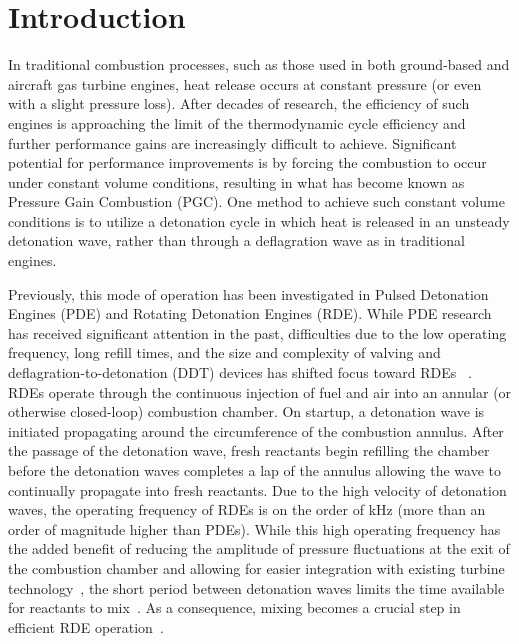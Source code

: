 \documentclass[10pt, twocolumn]{article}
\begin{document}
\saythanks %
\thispagestyle{empty} %


\section*{Introduction}
In traditional combustion processes, such as those used in both ground-based and aircraft gas turbine engines, heat release occurs at constant pressure (or even with a slight pressure loss). After decades of research, the efficiency of such engines is approaching the limit of the thermodynamic cycle efficiency and further performance gains are increasingly difficult to achieve. Significant potential for performance improvements is by forcing the combustion to occur under constant volume conditions, resulting in what has become known as Pressure Gain Combustion (PGC). One method to achieve such constant volume conditions is to utilize a detonation cycle in which heat is released in an unsteady detonation wave, rather than through a deflagration wave as in traditional engines.

Previously, this mode of operation has been investigated in Pulsed Detonation Engines (PDE) and Rotating Detonation Engines (RDE). While PDE research has received significant attention in the past, difficulties due to the low operating frequency, long refill times, and the size and complexity of valving and deflagration-to-detonation (DDT) devices has shifted focus toward RDEs ~\cite{Schwer1999}. RDEs operate through the continuous injection of fuel and air into an annular (or otherwise closed-loop) combustion chamber. On startup, a detonation wave is initiated propagating around the circumference of the combustion annulus. After the passage of the detonation wave, fresh reactants begin refilling the chamber before the detonation waves completes a lap of the annulus allowing the wave to continually propagate into fresh reactants. Due to the high velocity of detonation waves, the operating frequency of RDEs is on the order of kHz (more than an order of magnitude higher than PDEs). While this high operating frequency has the added benefit of reducing the amplitude of pressure fluctuations at the exit of the combustion chamber and allowing for easier integration with existing turbine technology~\cite{Naples2014}, the short period between detonation waves limits the time available for reactants to mix~\cite{Driscoll2016a}. As a consequence, mixing becomes a crucial step in efficient RDE operation~\cite{Nordeen2015,Driscoll2016a}.
\end{document}
